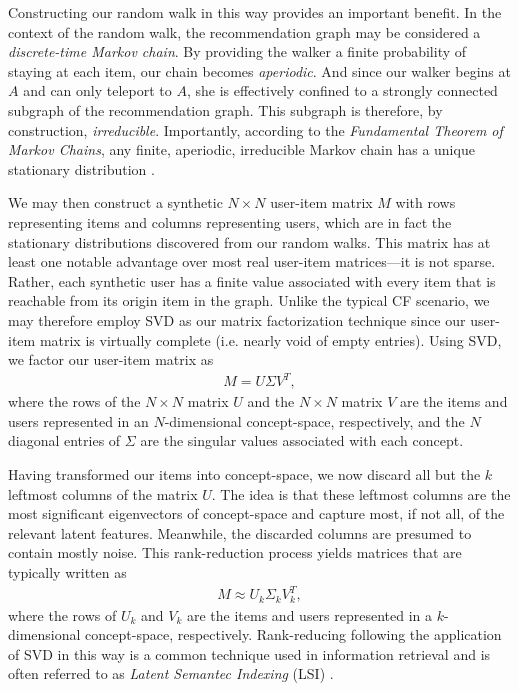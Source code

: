 \documentclass[11pt]{article}
\begin{document}
Constructing our random walk in this way provides an important benefit. In the
context of the random walk, the recommendation graph may be considered a {\em
discrete-time Markov chain}. By providing the walker a finite probability of
staying at each item, our chain becomes {\em aperiodic}. And since our walker
begins at $A$ and can only teleport to $A$, she is effectively confined to a
strongly connected subgraph of the recommendation graph. This subgraph is
therefore, by construction, {\em irreducible}.  Importantly, according to the
{\em Fundamental Theorem of Markov Chains}, any finite, aperiodic, irreducible
Markov chain has a unique stationary distribution \cite{Norris1998}.

We may then construct a synthetic $N \times N$ user-item matrix $M$ with rows
representing items and columns representing users, which are in fact the
stationary distributions discovered from our random walks. This matrix has at
least one notable advantage over most real user-item matrices---it is not
sparse.  Rather, each synthetic user has a finite value associated with every
item that is reachable from its origin item in the graph. Unlike the typical CF
scenario, we may therefore employ SVD as our matrix factorization technique
since our user-item matrix is virtually complete (i.e. nearly void of empty
entries).  Using SVD, we factor our user-item matrix as
\begin{align}
M = U \Sigma V^T,
\end{align}
where the rows of the $N \times N$ matrix $U$ and the $N \times N$ matrix $V$
are the items and users represented in an $N$-dimensional concept-space,
respectively, and the $N$ diagonal entries of $\Sigma$ are the singular values
associated with each concept.

Having transformed our items into concept-space, we now discard all but the $k$
leftmost columns of the matrix $U$. The idea is that these leftmost columns are
the most significant eigenvectors of concept-space and capture most, if not all,
of the relevant latent features. Meanwhile, the discarded columns are presumed
to contain mostly noise. This rank-reduction process yields matrices that are
typically written as
\begin{align}
M \approx U_k \Sigma_k V^T_k,
\end{align}
where the rows of $U_k$ and $V_k$ are the items and users represented in a
$k$-dimensional concept-space, respectively.  Rank-reducing following the
application of SVD in this way is a common technique used in information
retrieval and is often referred to as {\em Latent Semantec Indexing} (LSI)
\cite{Deerwester1990}.
\end{document}
